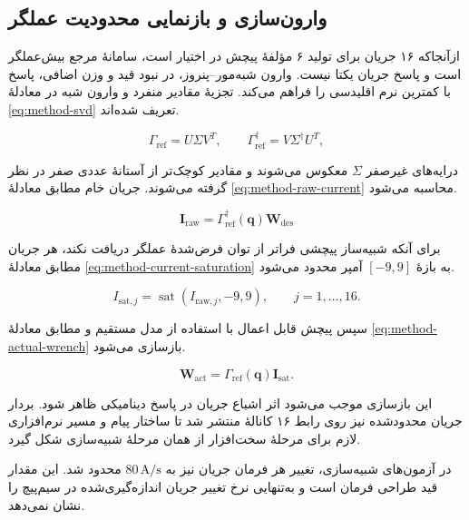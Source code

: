 \subsection{وارون‌سازی و بازنمایی محدودیت عملگر}
\label{subsec:method-pinv}

ازآنجاکه ۱۶ جریان برای تولید ۶ مؤلفهٔ پیچش در اختیار است، سامانهٔ مرجع بیش‌عملگر است و پاسخ جریان یکتا نیست. وارون شبه‌مور--پنروز، در نبود قید و وزن اضافی، پاسخ با کمترین نرم اقلیدسی را فراهم می‌کند. تجزیهٔ مقادیر منفرد و وارون شبه در معادلهٔ \ref{eq:method-svd} تعریف شده‌اند.

\begin{equation}
	\Gamma_{\mathrm{ref}}=U\Sigma V^T,
	\qquad \Gamma_{\mathrm{ref}}^{\dagger}=V\Sigma^{\dagger}U^T,
	\label{eq:method-svd}
\end{equation}

درایه‌های غیرصفر $\Sigma$ معکوس می‌شوند و مقادیر کوچک‌تر از آستانهٔ عددی صفر در نظر گرفته می‌شوند. جریان خام مطابق معادلهٔ \ref{eq:method-raw-current} محاسبه می‌شود.

\begin{equation}
	\mathbf I_{\mathrm{raw}}=\Gamma_{\mathrm{ref}}^{\dagger}(\mathbf q)\mathbf W_{\mathrm{des}}
	\label{eq:method-raw-current}
\end{equation}

برای آنکه شبیه‌ساز پیچشی فراتر از توان فرض‌شدهٔ عملگر دریافت نکند، هر جریان مطابق معادلهٔ \ref{eq:method-current-saturation} به بازهٔ $[-9,9]$ آمپر محدود می‌شود.

\begin{equation}
	I_{\mathrm{sat},j}=\operatorname{sat}(I_{\mathrm{raw},j},-9,9),\qquad j=1,\ldots,16.
	\label{eq:method-current-saturation}
\end{equation}

سپس پیچش قابل اعمال با استفاده از مدل مستقیم و مطابق معادلهٔ \ref{eq:method-actual-wrench} بازسازی می‌شود.

\begin{equation}
	\mathbf W_{\mathrm{act}}=\Gamma_{\mathrm{ref}}(\mathbf q)\mathbf I_{\mathrm{sat}}.
	\label{eq:method-actual-wrench}
\end{equation}

این بازسازی موجب می‌شود اثر اشباع جریان در پاسخ دینامیکی ظاهر شود. بردار جریان محدودشده نیز روی رابط ۱۶ کانالهٔ  منتشر شد تا ساختار پیام و مسیر نرم‌افزاری لازم برای مرحلهٔ سخت‌افزار از همان مرحلهٔ شبیه‌سازی شکل گیرد.

در آزمون‌های شبیه‌سازی، تغییر هر فرمان جریان نیز به $80\,\mathrm{A/s}$ محدود شد. این مقدار قید طراحی فرمان است و به‌تنهایی نرخ تغییر جریان اندازه‌گیری‌شده در سیم‌پیچ را نشان نمی‌دهد.

